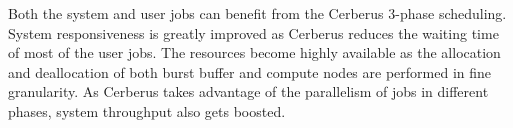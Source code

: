 Both the system and user jobs can benefit from the Cerberus 3-phase scheduling.
System responsiveness is greatly improved as Cerberus reduces the waiting time of most of the user jobs.
The resources become highly available as the allocation and deallocation of
both burst buffer and compute nodes are performed in fine granularity. 
As Cerberus takes advantage of the parallelism of jobs in different phases,
system throughput also gets boosted.

